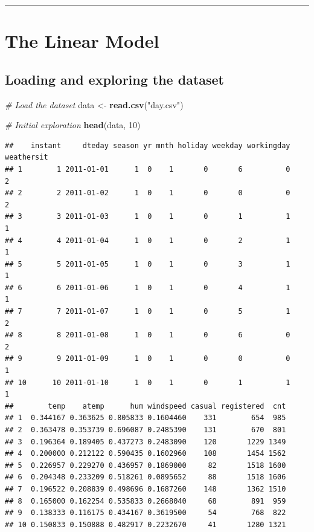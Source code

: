 \documentclass[
]{article}
\newenvironment{Shaded}{\begin{snugshade}}{\end{snugshade}}
\newcommand{\CommentTok}[1]{\textcolor[rgb]{0.56,0.35,0.01}{\textit{#1}}}
\newcommand{\DecValTok}[1]{\textcolor[rgb]{0.00,0.00,0.81}{#1}}
\newcommand{\FunctionTok}[1]{\textcolor[rgb]{0.13,0.29,0.53}{\textbf{#1}}}
\newcommand{\NormalTok}[1]{#1}
\newcommand{\OtherTok}[1]{\textcolor[rgb]{0.56,0.35,0.01}{#1}}
\newcommand{\StringTok}[1]{\textcolor[rgb]{0.31,0.60,0.02}{#1}}
\begin{document}
\begin{center}\rule{0.5\linewidth}{0.5pt}\end{center}

\section{The Linear Model}\label{the-linear-model}

\subsection{Loading and exploring the
dataset}\label{loading-and-exploring-the-dataset}

\begin{Shaded}
\begin{Highlighting}[]
\CommentTok{\# Load the dataset}
\NormalTok{data }\OtherTok{\textless{}{-}} \FunctionTok{read.csv}\NormalTok{(}\StringTok{"day.csv"}\NormalTok{)}

\CommentTok{\# Initial exploration}
\FunctionTok{head}\NormalTok{(data, }\DecValTok{10}\NormalTok{)}
\end{Highlighting}
\end{Shaded}

\begin{verbatim}
##    instant     dteday season yr mnth holiday weekday workingday weathersit
## 1        1 2011-01-01      1  0    1       0       6          0          2
## 2        2 2011-01-02      1  0    1       0       0          0          2
## 3        3 2011-01-03      1  0    1       0       1          1          1
## 4        4 2011-01-04      1  0    1       0       2          1          1
## 5        5 2011-01-05      1  0    1       0       3          1          1
## 6        6 2011-01-06      1  0    1       0       4          1          1
## 7        7 2011-01-07      1  0    1       0       5          1          2
## 8        8 2011-01-08      1  0    1       0       6          0          2
## 9        9 2011-01-09      1  0    1       0       0          0          1
## 10      10 2011-01-10      1  0    1       0       1          1          1
##        temp    atemp      hum windspeed casual registered  cnt
## 1  0.344167 0.363625 0.805833 0.1604460    331        654  985
## 2  0.363478 0.353739 0.696087 0.2485390    131        670  801
## 3  0.196364 0.189405 0.437273 0.2483090    120       1229 1349
## 4  0.200000 0.212122 0.590435 0.1602960    108       1454 1562
## 5  0.226957 0.229270 0.436957 0.1869000     82       1518 1600
## 6  0.204348 0.233209 0.518261 0.0895652     88       1518 1606
## 7  0.196522 0.208839 0.498696 0.1687260    148       1362 1510
## 8  0.165000 0.162254 0.535833 0.2668040     68        891  959
## 9  0.138333 0.116175 0.434167 0.3619500     54        768  822
## 10 0.150833 0.150888 0.482917 0.2232670     41       1280 1321
\end{verbatim}
\end{document}

